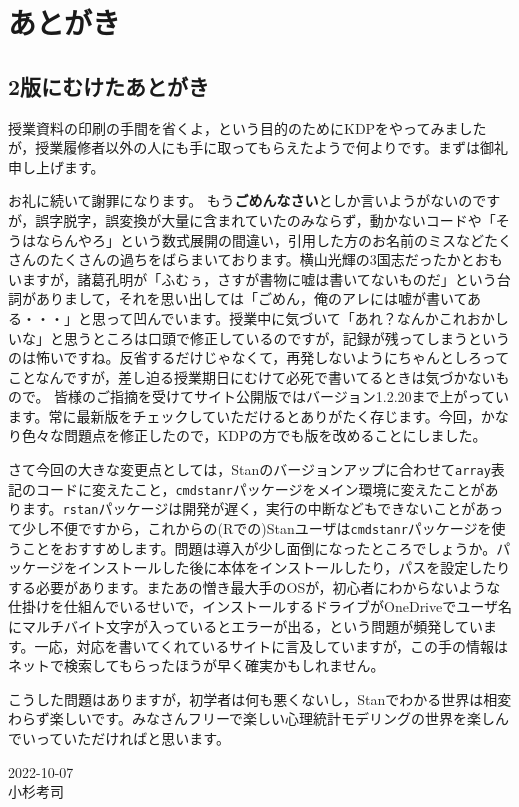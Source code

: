 \chapter*{あとがき}
\section*{2版にむけたあとがき}

授業資料の印刷の手間を省くよ，という目的のためにKDPをやってみましたが，授業履修者以外の人にも手に取ってもらえたようで何よりです。まずは御礼申し上げます。

お礼に続いて謝罪になります。
もう\textbf{ごめんなさい}としか言いようがないのですが，誤字脱字，誤変換が大量に含まれていたのみならず，動かないコードや「そうはならんやろ」という数式展開の間違い，引用した方のお名前のミスなどたくさんのたくさんの過ちをばらまいております。横山光輝の3国志だったかとおもいますが，諸葛孔明が「ふむぅ，さすが書物に嘘は書いてないものだ」という台詞がありまして，それを思い出しては「ごめん，俺のアレには嘘が書いてある・・・」と思って凹んでいます。授業中に気づいて「あれ？なんかこれおかしいな」と思うところは口頭で修正しているのですが，記録が残ってしまうというのは怖いですね。反省するだけじゃなくて，再発しないようにちゃんとしろってことなんですが，差し迫る授業期日にむけて必死で書いてるときは気づかないもので。
皆様のご指摘を受けてサイト公開版ではバージョン1.2.20まで上がっています。常に最新版をチェックしていただけるとありがたく存じます。今回，かなり色々な問題点を修正したので，KDPの方でも版を改めることにしました。

さて今回の大きな変更点としては，Stanのバージョンアップに合わせて\verb|array|表記のコードに変えたこと，\texttt{cmdstanr}パッケージをメイン環境に変えたことがあります。\texttt{rstan}パッケージは開発が遅く，実行の中断などもできないことがあって少し不便ですから，これからの(Rでの)Stanユーザは\texttt{cmdstanr}パッケージを使うことをおすすめします。問題は導入が少し面倒になったところでしょうか。パッケージをインストールした後に本体をインストールしたり，パスを設定したりする必要があります。またあの憎き最大手のOSが，初心者にわからないような仕掛けを仕組んでいるせいで，インストールするドライブがOneDriveでユーザ名にマルチバイト文字が入っているとエラーが出る，という問題が頻発しています。一応，対応を書いてくれているサイトに言及していますが，この手の情報はネットで検索してもらったほうが早く確実かもしれません。

こうした問題はありますが，初学者は何も悪くないし，Stanでわかる世界は相変わらず楽しいです。みなさんフリーで楽しい心理統計モデリングの世界を楽しんでいっていただければと思います。
\begin{flushright}
	2022-10-07\\
	小杉考司
\end{flushright}

